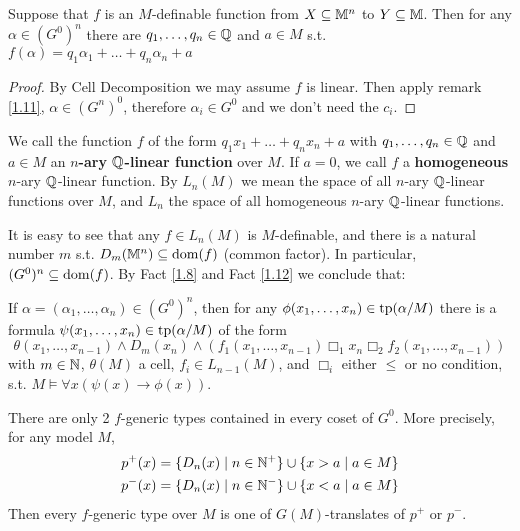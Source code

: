 \documentclass[11pt]{article}
\begin{document}
\begin{fact}[]
\label{1.12}
Suppose that \(f\) is an \(M\)-definable function from \(X\subseteq\mathbb{M}^n\) to \(Y\subseteq\mathbb{M}\). Then for
any \(\alpha\in(G^0)^n\) there are \(q_1,\dots,q_n\in\mathbb{Q}\) and \(a\in M\) s.t. \(f(\alpha)=q_1\alpha_1+\dots+q_n\alpha_n+a\)
\end{fact}

\begin{proof}
By Cell Decomposition we may assume \(f\) is linear. Then apply remark \ref{1.11},
\(\alpha\in(G^n)^0\), therefore \(\alpha_i\in G^0\) and we don't need the \(c_i\).
\end{proof}

\begin{definition}[]
We call the function \(f\) of the form \(q_1x_1+\dots+q_nx_n+a\) with \(q_1,\dots,q_n\in\mathbb{Q}\) and \(a\in M\) an
\textbf{\(n\)-ary \(\mathbb{Q}\)-linear function} over \(M\). If \(a=0\), we call \(f\) a
\textbf{homogeneous} \(n\)-ary \(\mathbb{Q}\)-linear function. By \(L_n(M)\) we mean the space of
all \(n\)-ary \(\mathbb{Q}\)-linear functions over \(M\), and \(L_n\) the space of all
homogeneous \(n\)-ary \(\mathbb{Q}\)-linear functions.
\end{definition}

It is easy to see that any \(f\in L_n(M)\) is \(M\)-definable, and there is a natural number \(m\)
s.t. \(D_m(\mathbb{M}^n)\subseteq\operatorname{dom}(f)\) (common factor). In particular, \((G^0)^n\subseteq\operatorname{dom}(f)\). By Fact \ref{1.8} and Fact \ref{1.12} we
conclude that:
\begin{corollary}[]
If \(\alpha=(\alpha_1,\dots,\alpha_n)\in(G^0)^n\), then for any \(\phi(x_1,\dots,x_n)\in\operatorname{tp}(\alpha/M)\) there is a
formula \(\psi(x_1,\dots,x_n)\in\operatorname{tp}(\alpha/M)\) of the form
\begin{equation*}
\theta(x_1,\dots,x_{n-1})\wedge D_m(x_n)\wedge(f_1(x_1,\dots,x_{n-1})\Box_1x_n\Box_2f_2(x_1,\dots,x_{n-1}))
\end{equation*}
with \(m\in\mathbb{N}\), \(\theta(M)\) a cell, \(f_i\in L_{n-1}(M)\), and \(\Box_i\) either \(\le\) or no condition,
s.t. \(M\vDash\forall x(\psi(x)\to\phi(x))\).
\end{corollary}

\begin{remark}
\label{1.15}
There are only 2 \(f\)-generic types contained in every coset of \(G^0\). More precisely, for any
model \(M\),
\begin{align*}
p^+(x)&=\{D_n(x)\mid n\in\mathbb{N}^+\}\cup\{x>a\mid a\in M\}\\
p^-(x)&=\{D_n(x)\mid n\in\mathbb{N}^-\}\cup\{x<a\mid a\in M\}
\end{align*}
Then every \(f\)-generic type over \(M\) is one of \(G(M)\)-translates of \(p^+\) or \(p^-\).
\end{remark}
\end{document}
